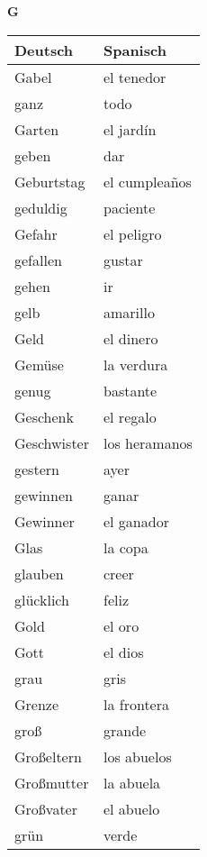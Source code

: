 \begin{flushright}\begin{Huge}\textbf{G}\end{Huge}\end{flushright}

\begin{longtable}{p{} p{}} 
\textbf{Deutsch}     & \textbf{Spanisch}                                       \\ \hline
\hline
\endhead %
Gabel & el tenedor\\
ganz & todo\\
Garten & el jardín\\
geben & dar\\
Geburtstag & el cumpleaños\\
geduldig & paciente\\
Gefahr & el peligro\\
gefallen & gustar\\
gehen & ir\\
gelb & amarillo \\
Geld & el dinero\\
Gemüse & la verdura\\
genug & bastante\\
Geschenk & el regalo\\
Geschwister & los heramanos \\
gestern & ayer\\
gewinnen & ganar\\
Gewinner & el ganador\\
Glas & la copa\\
glauben & creer\\
glücklich & feliz\\
Gold & el oro\\
Gott & el dios\\
grau & gris \\
Grenze & la frontera\\
groß & grande\\
Großeltern & los abuelos\\
Großmutter & la abuela\\
Großvater & el abuelo\\
grün & verde\\

\end{longtable}
